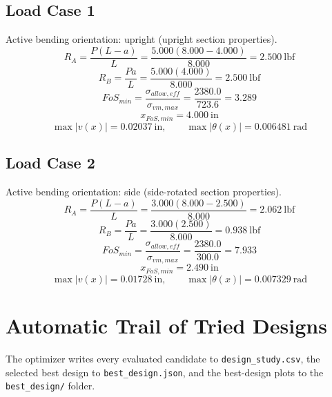 \documentclass[11pt]{article}
\begin{document}
\subsection*{Load Case 1}
Active bending orientation: upright (upright section properties).
\[R_A = \frac{P(L-a)}{L} = \frac{5.000(8.000-4.000)}{8.000} = 2.500\ \mathrm{lbf}\]
\[R_B = \frac{Pa}{L} = \frac{5.000(4.000)}{8.000} = 2.500\ \mathrm{lbf}\]
\[FoS_{min} = \frac{\sigma_{allow,eff}}{\sigma_{vm,max}} = \frac{2380.0}{723.6} = 3.289\]
\[x_{FoS,min} = 4.000\ \mathrm{in}\]
\[\max |v(x)| = 0.02037\ \mathrm{in}, \qquad \max |\theta(x)| = 0.006481\ \mathrm{rad}\]
\subsection*{Load Case 2}
Active bending orientation: side (side-rotated section properties).
\[R_A = \frac{P(L-a)}{L} = \frac{3.000(8.000-2.500)}{8.000} = 2.062\ \mathrm{lbf}\]
\[R_B = \frac{Pa}{L} = \frac{3.000(2.500)}{8.000} = 0.938\ \mathrm{lbf}\]
\[FoS_{min} = \frac{\sigma_{allow,eff}}{\sigma_{vm,max}} = \frac{2380.0}{300.0} = 7.933\]
\[x_{FoS,min} = 2.490\ \mathrm{in}\]
\[\max |v(x)| = 0.01728\ \mathrm{in}, \qquad \max |\theta(x)| = 0.007329\ \mathrm{rad}\]

\section*{Automatic Trail of Tried Designs}
The optimizer writes every evaluated candidate to \texttt{design\_study.csv}, the selected best design to \texttt{best\_design.json}, and the best-design plots to the \texttt{best\_design/} folder.
\end{document}
